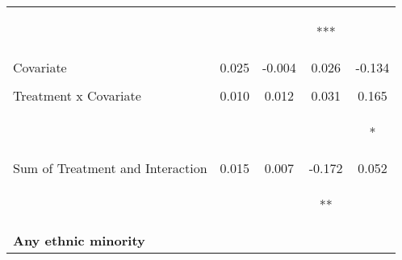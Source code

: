 \begin{tabular}{lcccc}
 & \begin{footnotesize}[0.016]\end{footnotesize} & \begin{footnotesize}[0.007]\end{footnotesize} & \begin{footnotesize}[0.073]***\end{footnotesize} & \begin{footnotesize}[0.068]\end{footnotesize}\\
\noalign{\smallskip}Covariate & 0.025 & -0.004 & 0.026 & -0.134\\
 & \begin{footnotesize}[0.025]\end{footnotesize} & \begin{footnotesize}[0.010]\end{footnotesize} & \begin{footnotesize}[0.084]\end{footnotesize} & \begin{footnotesize}[0.093]\end{footnotesize}\\
\noalign{\smallskip}Treatment x Covariate & 0.010 & 0.012 & 0.031 & 0.165\\
 & \begin{footnotesize}[0.020]\end{footnotesize} & \begin{footnotesize}[0.009]\end{footnotesize} & \begin{footnotesize}[0.112]\end{footnotesize} & \begin{footnotesize}[0.094]*\end{footnotesize}\\
\noalign{\smallskip}Sum of Treatment and Interaction & 0.015 & 0.007 & -0.172 & 0.052\\
 & \begin{footnotesize}[0.013]\end{footnotesize} & \begin{footnotesize}[0.006]\end{footnotesize} & \begin{footnotesize}[0.076]**\end{footnotesize} & \begin{footnotesize}[0.063]\end{footnotesize}\\
\noalign{\smallskip}\textbf{Any ethnic minority} &  &  &  & \\

\end{tabular}
